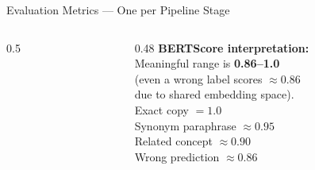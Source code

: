 \documentclass[aspectratio=169,10pt]{beamer}
\begin{document}
\begin{frame}{Evaluation Metrics — One per Pipeline Stage}
\begin{columns}
\begin{column}{0.5\textwidth}
    \end{column}
    \begin{column}{0.48\textwidth}
      \small
      \textbf{BERTScore interpretation:}\\[3pt]
      Meaningful range is \textbf{0.86–1.0}\\
      (even a wrong label scores $\approx$0.86\\
      due to shared embedding space).\\[5pt]
      Exact copy $= 1.0$\\
      Synonym paraphrase $\approx 0.95$\\
      Related concept $\approx 0.90$\\
      Wrong prediction $\approx 0.86$
    \end{column}
  \end{columns}
\end{frame}
\end{document}
